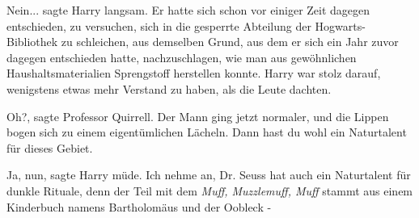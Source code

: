 \glqq{}Nein...\grqq{} sagte Harry langsam. Er hatte sich schon vor einiger Zeit
dagegen entschieden, zu versuchen, sich in die gesperrte Abteilung der
Hogwarts-Bibliothek zu schleichen, aus demselben Grund, aus dem er sich ein Jahr
zuvor dagegen entschieden hatte, nachzuschlagen, wie man aus gewöhnlichen
Haushaltsmaterialien Sprengstoff herstellen konnte. Harry war stolz darauf,
wenigstens etwas mehr Verstand zu haben, als die Leute dachten.

\glqq{}Oh?\grqq{}, sagte Professor Quirrell. Der Mann ging jetzt normaler, und
die Lippen bogen sich zu einem eigentümlichen Lächeln. \glqq{}Dann hast du wohl
ein Naturtalent für dieses Gebiet.\grqq{}

\glqq{}Ja, nun\grqq{}, sagte Harry müde. \glqq{}Ich nehme an, Dr. Seuss hat auch
ein Naturtalent für dunkle Rituale, denn der Teil mit dem \emph{Muff,
Muzzlemuff, Muff} stammt aus einem Kinderbuch namens Bartholomäus und der
Oobleck -\grqq{}

